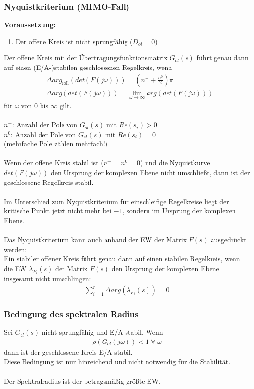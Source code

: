 \documentclass[a4paper,twocolumn,10pt]{article}
\begin{document}
\subsubsection{Nyquistkriterium (MIMO-Fall)}
\textbf{Voraussetzung:}
\begin{enumerate}[label=$\bullet$]
\item Der offene Kreis ist nicht sprungfähig ($D_{ol}=0$)
\end{enumerate}
Der offene Kreis mit der Übertragungsfunktionsmatrix $G_{ol}(s)$ führt genau dann auf einen (E/A-)stabilen geschlossenen Regelkreis, wenn
\begin{align*}
&\Delta arg_{\text{soll}}(det(F(j\omega)))=\left(n^++\frac{n^0}{2}\right)\pi\\
&\Delta arg(det(F(j\omega)))=\lim\limits_{\omega\rightarrow\infty}arg(det(F(j\omega)))
\end{align*}
für $\omega$ von $0$ bis $\infty$ gilt.\\\\
$n^+$: Anzahl der Pole von $G_{ol}(s)$ mit $Re(s_i)>0$\\
$n^0$: Anzahl der Pole von $G_{ol}(s)$ mit $Re(s_i)=0$\\
(mehrfache Pole zählen mehrfach!)\\\\
Wenn der offene Kreis stabil ist ($n^+=n^0=0$) und die Nyquistkurve $det(F(j\omega))$ den Ursprung der komplexen Ebene nicht umschließt, dann ist der geschlossene Regelkreis stabil.\\\\
Im Unterschied zum Nyquistkriterium für einschleifige Regelkreise liegt der kritische Punkt jetzt nicht mehr bei $-1$, sondern im Ursprung der komplexen Ebene.\\\\
Das Nyquistkriterium kann auch anhand der EW der Matrix $F(s)$ ausgedrückt werden:\\
Ein stabiler offener Kreis führt genau dann auf einen stabilen Regelkreis, wenn die EW $\lambda_{F_i}(s)$ der Matrix $F(s)$ den Ursprung der komplexen Ebene insgesamt nicht umschlingen:
\begin{align*}
\sum\limits_{i=1}^r\Delta arg(\lambda_{F_i}(s))=0
\end{align*}

\subsubsection{Bedingung des spektralen Radius}
Sei $G_{ol}(s)$ nicht sprungfähig und E/A-stabil. Wenn
\begin{align*}
\rho(G_{ol}(j\omega))<1\;\forall\;\omega
\end{align*}
dann ist der geschlossene Kreis E/A-stabil.\\
Diese Bedingung ist nur hinreichend und nicht notwendig für die Stabilität.\\\\
Der Spektralradius ist der betragsmäßig größte EW.
\end{document}
